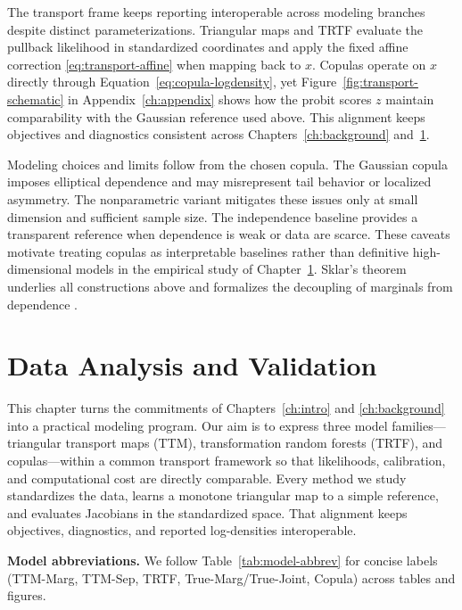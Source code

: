 \documentclass[11pt,a4paper,twoside]{book}\usepackage[]{graphicx}\usepackage[]{xcolor}
\begin{document}
The transport frame keeps reporting interoperable across modeling branches despite distinct parameterizations. Triangular maps and TRTF evaluate the pullback likelihood in standardized coordinates and apply the fixed affine correction \eqref{eq:transport-affine} when mapping back to $x$. Copulas operate on $x$ directly through Equation~\eqref{eq:copula-logdensity}, yet Figure~\ref{fig:transport-schematic} in Appendix~\ref{ch:appendix} shows how the probit scores $z$ maintain comparability with the Gaussian reference used above. This alignment keeps objectives and diagnostics consistent across Chapters~\ref{ch:background} and~\ref{ch:dataanalysis}.

Modeling choices and limits follow from the chosen copula. The Gaussian copula imposes elliptical dependence and may misrepresent tail behavior or localized asymmetry. The nonparametric variant mitigates these issues only at small dimension and sufficient sample size. The independence baseline provides a transparent reference when dependence is weak or data are scarce. These caveats motivate treating copulas as interpretable baselines rather than definitive high-dimensional models in the empirical study of Chapter~\ref{ch:dataanalysis}. Sklar’s theorem underlies all constructions above and formalizes the decoupling of marginals from dependence \citep{sklar1959fonctions}.





\chapter{Data Analysis and Validation}\label{ch:dataanalysis}

This chapter turns the commitments of Chapters~\ref{ch:intro} and \ref{ch:background} into a practical modeling program. Our aim is to express three model families---triangular transport maps (TTM), transformation random forests (TRTF), and copulas---within a common transport framework so that likelihoods, calibration, and computational cost are directly comparable. Every method we study standardizes the data, learns a monotone triangular map to a simple reference, and evaluates Jacobians in the standardized space. That alignment keeps objectives, diagnostics, and reported log-densities interoperable.

\textbf{Model abbreviations.} We follow Table~\ref{tab:model-abbrev} for concise labels (TTM-Marg, TTM-Sep, TRTF, True-Marg/True-Joint, Copula) across tables and figures.
\end{document}

